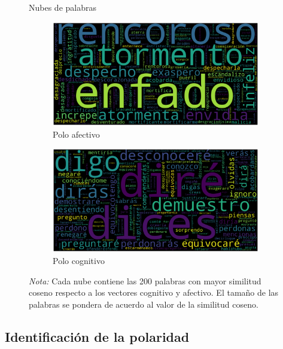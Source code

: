 \documentclass[
  12pt,
]{article}
\begin{document}
\begin{figure}[H]
     \caption{Nubes de palabras }
     \centering
     \begin{subfigure}[b]{0.4\textwidth}
         \centering
         \includegraphics[width=\textwidth]{cuadros_tesis/wordcloud_affective.png}
         \caption{Polo afectivo}
         \label{fig:nube_afectiva}
     \end{subfigure}
     \begin{subfigure}[b]{0.4\textwidth}
         \centering
         \includegraphics[width=\textwidth]{cuadros_tesis/wordcloud_cognitive.png}
         \caption{Polo cognitivo}
         \label{fig:nube_cognitiva}
     \end{subfigure}
     \label{fig:nubes}
     \caption*{\footnotesize{\textit{Nota:} Cada nube contiene las 200 palabras con mayor similitud coseno respecto a los vectores cognitivo y afectivo. El tamaño de las palabras se pondera de acuerdo al valor de la similitud coseno.}}
\end{figure}

\hypertarget{identificaciuxf3n-de-la-polaridad}{%
\subsection{Identificación de la
polaridad}\label{identificaciuxf3n-de-la-polaridad}}
\end{document}
